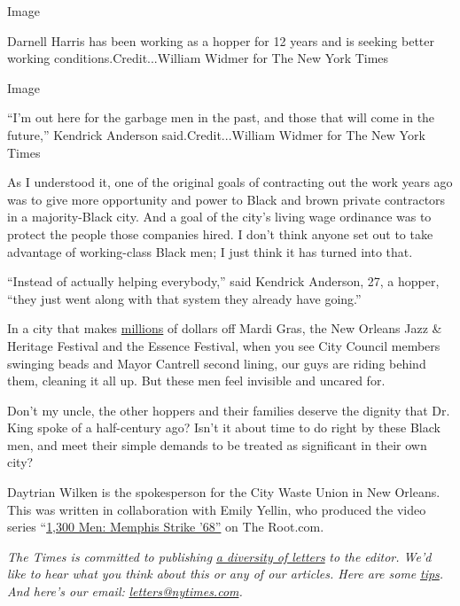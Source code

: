 Image

Darnell Harris has been working as a hopper for 12 years and is seeking
better working conditions.Credit...William Widmer for The New York Times

Image

``I'm out here for the garbage men in the past, and those that will come
in the future,'' Kendrick Anderson said.Credit...William Widmer for The
New York Times

As I understood it, one of the original goals of contracting out the
work years ago was to give more opportunity and power to Black and brown
private contractors in a majority-Black city. And a goal of the city's
living wage ordinance was to protect the people those companies hired. I
don't think anyone set out to take advantage of working-class Black men;
I just think it has turned into that.

``Instead of actually helping everybody,'' said Kendrick Anderson, 27, a
hopper, ``they just went along with that system they already have
going.''

In a city that makes
\href{https://www.wdsu.com/article/nungesser-new-orleans-region-to-see-a-billion-dollar-tax-revenue-loss-due-to-pandemic/32179410}{millions}
of dollars off Mardi Gras, the New Orleans Jazz \& Heritage Festival and
the Essence Festival, when you see City Council members swinging beads
and Mayor Cantrell second lining, our guys are riding behind them,
cleaning it all up. But these men feel invisible and uncared for.

Don't my uncle, the other hoppers and their families deserve the dignity
that Dr. King spoke of a half-century ago? Isn't it about time to do
right by these Black men, and meet their simple demands to be treated as
significant in their own city?

Daytrian Wilken is the spokesperson for the City Waste Union in New
Orleans. This was written in collaboration with Emily Yellin, who
produced the video series
``\href{https://www.theroot.com/c/1300-men-memphis-strike-68}{1,300 Men:
Memphis Strike '68''} on The Root.com.

\emph{The Times is committed to publishing}
\href{https://www.nytimes.com/2019/01/31/opinion/letters/letters-to-editor-new-york-times-women.html}{\emph{a
diversity of letters}} \emph{to the editor. We'd like to hear what you
think about this or any of our articles. Here are some}
\href{https://help.nytimes.com/hc/en-us/articles/115014925288-How-to-submit-a-letter-to-the-editor}{\emph{tips}}\emph{.
And here's our email:}
\href{mailto:letters@nytimes.com}{\emph{letters@nytimes.com}}\emph{.}

